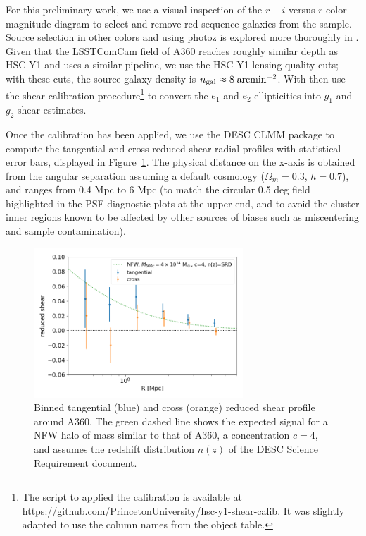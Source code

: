 \documentclass[SE,lsstdraft,authoryear,toc]{lsstdoc}
\begin{document}
For this preliminary work, we use a visual inspection of the $r-i$ versus $r$ color-magnitude diagram to select and remove red sequence galaxies from the sample. Source selection in other colors and using photoz is explored more thoroughly in . 
Given that the LSSTComCam field of A360 reaches roughly similar depth as HSC Y1 and uses a similar pipeline, we use the HSC Y1 lensing quality cuts; with these cuts, the source galaxy density is $n_{\rm gal}\approx 8\;{\rm arcmin}^{-2}$.  With then use the shear calibration procedure\footnote{The script to applied the calibration is available at \url{https://github.com/PrincetonUniversity/hsc-y1-shear-calib}. It was slightly adapted to use the column names from the object table.} \citep{2018MNRAS.481.3170M} to convert the $e_1$ and $e_2$ ellipticities into $g_1$ and $g_2$ shear estimates. 

Once the calibration has been applied, we use the DESC CLMM package \citep{2021MNRAS.508.6092A} to compute the tangential and cross reduced shear radial profiles with statistical error bars, displayed in Figure~\ref{fig:shear_profile}. The physical distance on the x-axis is obtained from the angular separation assuming a default cosmology ($\Omega_m=0.3$, $h=0.7$), and ranges from 0.4 Mpc to 6 Mpc (to match the circular 0.5 deg field highlighted in the PSF diagnostic plots at the upper end, and to avoid the cluster inner regions known to be affected by other sources of biases such as miscentering and sample contamination). 

\begin{figure}
\centering
\includegraphics[width=0.7\textwidth]{Figures/shear_profile.png}
\caption{Binned tangential (blue) and cross (orange) reduced shear profile around A360. The green dashed line shows the expected signal for a NFW halo of mass similar to that of A360, a concentration $c=4$, and assumes the redshift distribution $n(z)$ of the DESC Science Requirement document. \label{fig:shear_profile}}
\end{figure}
\end{document}
